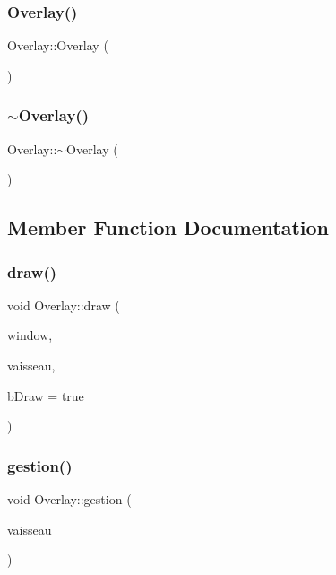 \subsubsection{\texorpdfstring{Overlay()}{Overlay()}}
{\footnotesize\ttfamily Overlay\+::\+Overlay (\begin{DoxyParamCaption}{ }\end{DoxyParamCaption})\hspace{0.3cm}{\ttfamily [inline]}}

\mbox{\label{class_overlay_ad40a5e109ee4acbdec9f21d5496b7fa9}} 
\subsubsection{\texorpdfstring{$\sim$\+Overlay()}{~Overlay()}}
{\footnotesize\ttfamily Overlay\+::$\sim$\+Overlay (\begin{DoxyParamCaption}{ }\end{DoxyParamCaption})}



\subsection{Member Function Documentation}
\mbox{\label{class_overlay_a56719e5808fe4c5a2b6a1862a6a6110a}} 
\subsubsection{\texorpdfstring{draw()}{draw()}}
{\footnotesize\ttfamily void Overlay\+::draw (\begin{DoxyParamCaption}\item[{sf\+::\+Render\+Window \&}]{window,  }\item[{\mbox{\hyperlink{def__type_8h_a03925a047830157ad843b4224e7f63ba}{vaisseau\+\_\+ptr}}}]{vaisseau,  }\item[{bool}]{b\+Draw = {\ttfamily true} }\end{DoxyParamCaption})}

\mbox{\label{class_overlay_ab786c282e5e4bf0b583065b5cde9bd1c}} 
\subsubsection{\texorpdfstring{gestion()}{gestion()}}
{\footnotesize\ttfamily void Overlay\+::gestion (\begin{DoxyParamCaption}\item[{\mbox{\hyperlink{def__type_8h_a03925a047830157ad843b4224e7f63ba}{vaisseau\+\_\+ptr}}}]{vaisseau }\end{DoxyParamCaption})}

